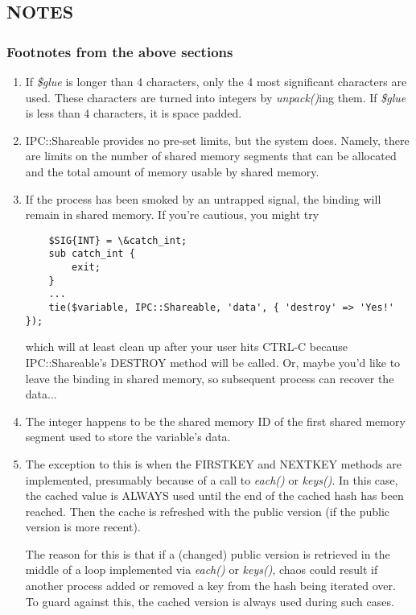 \subsection*{NOTES}
\subsubsection*{Footnotes from the above sections}%

\begin{enumerate}

\item
If {\em \$glue\/} is longer than 4 characters, only the 4 most significant
characters are used.  These characters are turned into integers by {\em unpack()\/}ing
them.  If {\em \$glue\/} is less than 4 characters, it is space padded.

\item
IPC::Shareable provides no pre-set limits, but the system does.
Namely, there are limits on the number of shared memory segments that
can be allocated and the total amount of memory usable by shared
memory.

\item
If the process has been smoked by an untrapped signal, the binding
will remain in shared memory.  If you're cautious, you might try
\begin{verbatim}
    $SIG{INT} = \&catch_int;
    sub catch_int {
        exit;
    }
    ...
    tie($variable, IPC::Shareable, 'data', { 'destroy' => 'Yes!' });
\end{verbatim}

which will at least clean up after your user hits CTRL-C because
IPC::Shareable's DESTROY method will be called.  Or, maybe you'd like
to leave the binding in shared memory, so subsequent process can
recover the data...

\item
The integer happens to be the shared memory ID of the first shared
memory segment used to store the variable's data.

\item
The exception to this is when the FIRSTKEY and NEXTKEY methods are
implemented, presumably because of a call to {\em each()\/} or {\em keys()\/}.  In
this case, the cached value is ALWAYS used until the end of the cached
hash has been reached.  Then the cache is refreshed with the public
version (if the public version is more recent).

The reason for this is that if a (changed) public version is retrieved
in the middle of a loop implemented via {\em each()\/} or {\em keys()\/}, chaos could
result if another process added or removed a key from the hash being
iterated over.  To guard against this, the cached version is always
used during such cases.


\end{enumerate}
